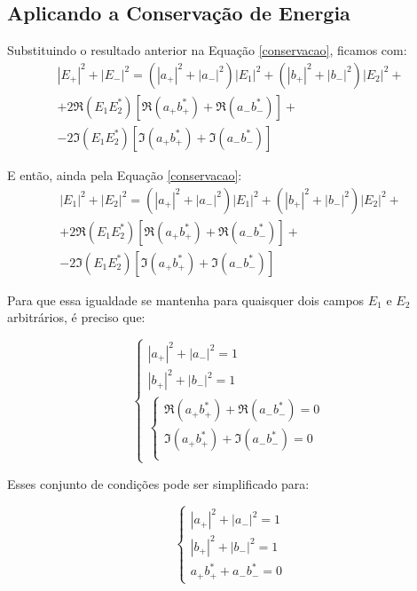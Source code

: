 \documentclass[12pt,a4paper]{report}
\begin{document}
\subsection{Aplicando a Conservação de Energia}

Substituindo o resultado anterior na Equação \ref{conservacao}, ficamos com:
\begin{multline*}
|E_{+}|^2+|E_{-}|^2 =(|a_{+}|^2+|a_{-}|^2)|E_{1}|^2 + (|b_{+}|^2+|b_{-}|^2)|E_{2}|^2 +\\ +2\Re(E_1E^*_{2})[\Re(a_{+}b^*_{+})+\Re(a_{-}b^*_{-})]+\\-2\Im(E_1E^*_{2})[\Im(a_{+}b^*_{+})+\Im(a_{-}b^*_{-})]
\end{multline*}

E então, ainda pela Equação \ref{conservacao}:
\begin{multline*}
|E_{1}|^2+|E_{2}|^2 =(|a_{+}|^2+|a_{-}|^2)|E_{1}|^2 + (|b_{+}|^2+|b_{-}|^2)|E_{2}|^2 +\\ +2\Re(E_1E^*_{2})[\Re(a_{+}b^*_{+})+\Re(a_{-}b^*_{-})]+\\-2\Im(E_1E^*_{2})[\Im(a_{+}b^*_{+})+\Im(a_{-}b^*_{-})]
\end{multline*}

Para que essa igualdade se mantenha para quaisquer dois campos $E_1$ e $E_2$ arbitrários, é preciso que:

\begin{equation*}
\begin{cases}
    |a_{+}|^2+|a_{-}|^2=1\\[0.3cm]
    |b_{+}|^2+|b_{-}|^2=1\\[0.3cm]
    \begin{cases}
        \Re(a_{+}b^*_{+})+\Re(a_{-}b^*_{-})=0\\
        \Im(a_{+}b^*_{+})+\Im(a_{-}b^*_{-})=0\\
    \end{cases}
\end{cases}
\end{equation*}

Esses conjunto de condições pode ser simplificado para:

\begin{equation}
\begin{cases}
    |a_{+}|^2+|a_{-}|^2=1\\[0.3cm]
    |b_{+}|^2+|b_{-}|^2=1\\[0.3cm]
    a_+b^*_{+}+a_{-}b^*_{-}=0
\end{cases}
\label{sistema}
\end{equation}
\end{document}
